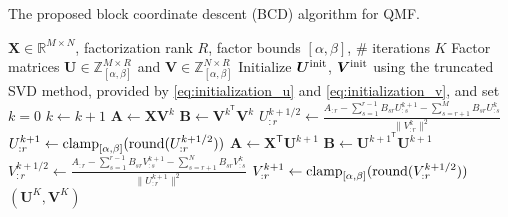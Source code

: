 \begin{algorithm}[!t]
    \caption{The proposed block coordinate descent (BCD) algorithm for QMF. \label{alg:bcd_for_qmf}}
    \begin{algorithmic}[1]
        \REQUIRE $\bm{X} \in \mathbb{R}^{M \times N}$, factorization rank $R$, factor bounds $[\alpha,\beta]$, \# iterations $K$
        \ENSURE Factor matrices $\bm{U} \in \mathbb{Z}_{[\alpha,\beta]}^{M \times R}$ and $\bm{V} \in \mathbb{Z}_{[\alpha,\beta]}^{N \times R}$
        \STATE Initialize $\bm{U}^{\rm init}$, $\bm{V}^{\rm init}$ using the truncated SVD method, provided by \eqref{eq:initialization_u} and \eqref{eq:initialization_v}, and set $k=0$
        \STATE $k \gets k+1$
        \STATE $\bm{A} \gets \bm{X} \bm{V}^k$
        \STATE $\bm{B} \gets \bm{V}^{k^{\mathsf{T}}} \bm{V}^k$
        \STATE \label{alg:step:u_update:1} $\displaystyle U_{:r}^{k+1/2} \gets \frac{A_{:r} - \sum_{s = 1}^{r-1} B_{sr} U_{:s}^{k+1} - \sum_{s=r+1}^M B_{sr} U_{:s}^k}{\| V_{:r}^k \|^2}$
        \vspace{2pt}
        \STATE \label{alg:step:u_update:2} $\displaystyle U_{:r}^{k+1} \gets \operatorname{clamp}_{[\alpha,\beta]}(\operatorname{round}( U_{:r}^{k+1/2}))$
        \ENDFOR
        \STATE $\bm{A} \gets \bm{X}^\mathsf{T} \bm{U}^{k+1}$
        \STATE $\bm{B} \gets \bm{U}^{{k+1}^\mathsf{T}} \bm{U}^{k+1}$
        \STATE \label{alg:step:v_update:1} $\displaystyle V_{:r}^{k+1/2} \gets \frac{A_{:r} - \sum_{s = 1}^{r-1} B_{sr} V_{:s}^{k+1} - \sum_{s = r+1}^N B_{sr} V_{:s}^k}{\| U_{:r}^{k+1} \|^2}$
        \vspace{2pt}
        \STATE \label{alg:step:v_update:2} $\displaystyle V_{:r}^{k+1} \gets \operatorname{clamp}_{[\alpha,\beta]}(\operatorname{round}(V_{:r}^{k+1/2}))$
        \ENDFOR
        \ENDWHILE
        \RETURN $(\bm{U}^K, \bm{V}^K)$
    \end{algorithmic}
\end{algorithm}

